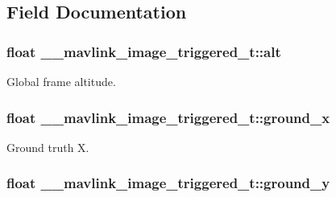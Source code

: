 \subsection{Field Documentation}
\hypertarget{struct____mavlink__image__triggered__t_a8a3d3a4523082e1a47d8ac34e2db7572}{
\subsubsection[{alt}]{\setlength{\rightskip}{0pt plus 5cm}float \+\_\+\+\_\+mavlink\+\_\+image\+\_\+triggered\+\_\+t\+::alt}}\label{struct____mavlink__image__triggered__t_a8a3d3a4523082e1a47d8ac34e2db7572}


Global frame altitude. 

\hypertarget{struct____mavlink__image__triggered__t_a2a4b5d026c178f8a7abb531368f850a9}{
\subsubsection[{ground\+\_\+x}]{\setlength{\rightskip}{0pt plus 5cm}float \+\_\+\+\_\+mavlink\+\_\+image\+\_\+triggered\+\_\+t\+::ground\+\_\+x}}\label{struct____mavlink__image__triggered__t_a2a4b5d026c178f8a7abb531368f850a9}


Ground truth X. 

\hypertarget{struct____mavlink__image__triggered__t_a30e2fc24992a8510a84014439400f985}{
\subsubsection[{ground\+\_\+y}]{\setlength{\rightskip}{0pt plus 5cm}float \+\_\+\+\_\+mavlink\+\_\+image\+\_\+triggered\+\_\+t\+::ground\+\_\+y}}\label{struct____mavlink__image__triggered__t_a30e2fc24992a8510a84014439400f985}


